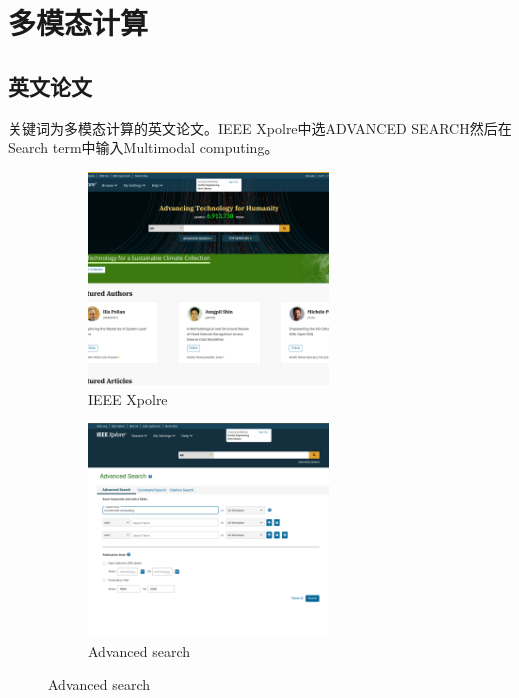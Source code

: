 \section{多模态计算}

\subsection{英文论文}
关键词为多模态计算的英文论文。IEEE Xpolre中选ADVANCED SEARCH然后在Search term中输入Multimodal computing。

\begin{figure}[H]
    \centering
    \begin{subfigure}{0.8\textwidth}
        \centering
        \includegraphics[width=0.7\textwidth]{./asserts/ieee_xpolre.png}
        \caption{IEEE Xpolre}
    \end{subfigure}


    \begin{subfigure}{0.8\textwidth}
        \centering
        \includegraphics[width=0.7\textwidth]{./asserts/en_search_multi_modal.png}
        \caption{Advanced search}
    \end{subfigure}
\end{figure}


